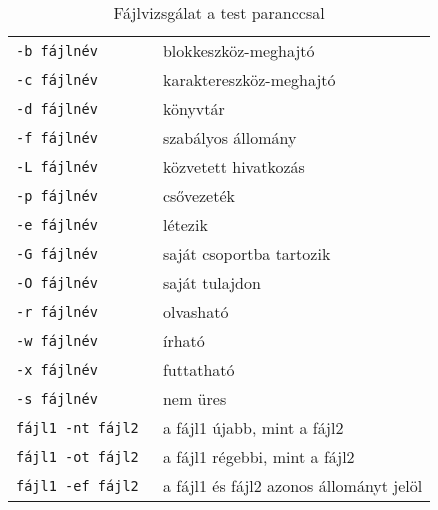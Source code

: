 \begin{table}[!h]
\centering
 \begin{tabular}{|ll|}
          \hline
\tt -b fájlnév	& blokkeszköz-meghajtó
\\
\tt -c fájlnév	& karaktereszköz-meghajtó
\\
\tt -d fájlnév	& könyvtár
\\
\tt -f fájlnév	& szabályos állomány
\\
\tt -L fájlnév	& közvetett hivatkozás
\\
\tt -p fájlnév	& csővezeték
\\
\tt -e fájlnév	& létezik
\\
\tt -G fájlnév	& saját csoportba tartozik
\\
\tt -O fájlnév	& saját tulajdon
\\	
\tt -r fájlnév	& olvasható
\\
\tt -w fájlnév	& írható
\\
\tt -x fájlnév	& futtatható
\\
\tt -s fájlnév	& nem üres
\\
\hline
\tt fájl1 -nt fájl2	& a fájl1 újabb, mint a fájl2
\\
\tt fájl1 -ot fájl2	& a fájl1 régebbi, mint a fájl2
\\
\tt fájl1 -ef fájl2	& a fájl1 és fájl2 azonos állományt jelöl
\\
\hline
  \end{tabular}
\caption{Fájlvizsgálat a test paranccsal}
 \end{table}

